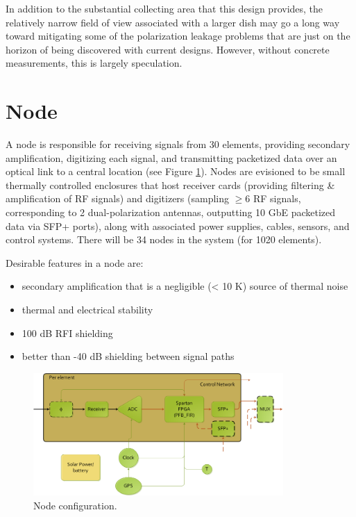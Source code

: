 \documentclass[11pt]{article}
\begin{document}
In addition to the substantial collecting area that this design provides, the relatively narrow field of
view associated with a larger dish may go a long way toward mitigating some of the polarization leakage
problems that are just on the horizon of being discovered with current designs.  However, without concrete
measurements, this is largely speculation.

\section{Node}

A node is responsible for receiving signals from 30 elements, providing secondary amplification,
digitizing each signal, and transmitting packetized data over an optical link to a central location
(see Figure \ref{fig:node}).  Nodes are evisioned to be small thermally controlled enclosures that host
receiver cards (providing filtering \& amplification of RF signals) and digitizers (sampling $\ge$6 RF signals,
corresponding to 2 dual-polarization antennas, outputting 10 GbE packetized data via SFP+ ports), along
with associated power supplies, cables, sensors, and control systems.  There will be 34 nodes in the system (for
1020 elements).

Desirable features in a node are:
\begin{itemize}
\item secondary amplification that is a negligible (< 10 K) source of thermal noise
\item thermal and electrical stability
\item 100 dB RFI shielding
\item better than -40 dB shielding between signal paths
\end{itemize}

\begin{figure}[h]
\centering
\includegraphics[width=0.85\textwidth]{plots/Node.png}
\caption{Node configuration.}
\label{fig:node}
\end{figure}
\end{document}
